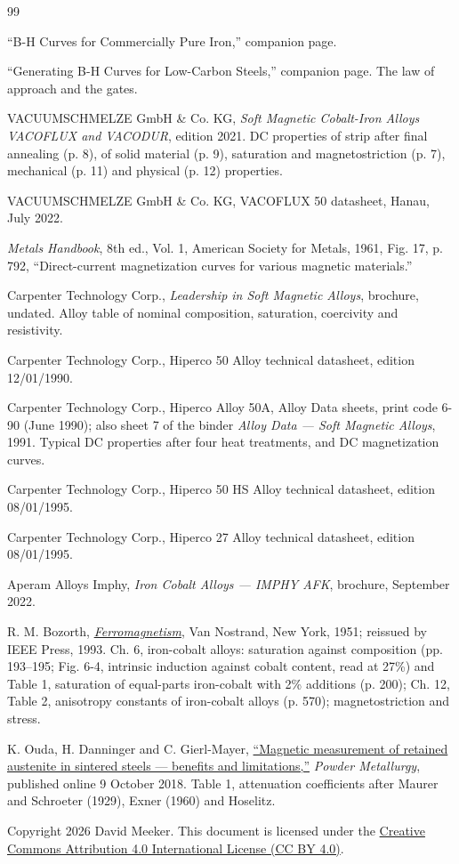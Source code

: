 \documentclass[
  11pt,
]{article}
\begin{document}
\begin{thebibliography}{99}\label{references}

 ``B-H Curves for Commercially Pure Iron,'' companion page.

 ``Generating B-H Curves for Low-Carbon Steels,'' companion page. The law of approach and the gates.

 VACUUMSCHMELZE GmbH \& Co. KG, \emph{Soft Magnetic Cobalt-Iron Alloys VACOFLUX and VACODUR}, edition 2021. DC properties of strip after final annealing (p. 8), of solid material (p. 9), saturation and magnetostriction (p. 7), mechanical (p. 11) and physical (p. 12) properties.

 VACUUMSCHMELZE GmbH \& Co. KG, VACOFLUX 50 datasheet, Hanau, July 2022.

 \emph{Metals Handbook}, 8th ed., Vol. 1, American Society for Metals, 1961, Fig. 17, p. 792, ``Direct-current magnetization curves for various magnetic materials.''

 Carpenter Technology Corp., \emph{Leadership in Soft Magnetic Alloys}, brochure, undated. Alloy table of nominal composition, saturation, coercivity and resistivity.

 Carpenter Technology Corp., Hiperco 50 Alloy technical datasheet, edition 12/01/1990.

 Carpenter Technology Corp., Hiperco Alloy 50A, Alloy Data sheets, print code 6-90 (June 1990); also sheet 7 of the binder \emph{Alloy Data --- Soft Magnetic Alloys}, 1991. Typical DC properties after four heat treatments, and DC magnetization curves.

 Carpenter Technology Corp., Hiperco 50 HS Alloy technical datasheet, edition 08/01/1995.

 Carpenter Technology Corp., Hiperco 27 Alloy technical datasheet, edition 08/01/1995.

 Aperam Alloys Imphy, \emph{Iron Cobalt Alloys --- IMPHY AFK}, brochure, September 2022.

 R. M. Bozorth, \href{https://doi.org/10.1109/9780470544624}{\emph{Ferromagnetism}}, Van Nostrand, New York, 1951; reissued by IEEE Press, 1993. Ch. 6, iron-cobalt alloys: saturation against composition (pp. 193--195; Fig. 6-4, intrinsic induction against cobalt content, read at 27\%) and Table 1, saturation of equal-parts iron-cobalt with 2\% additions (p. 200); Ch. 12, Table 2, anisotropy constants of iron-cobalt alloys (p. 570); magnetostriction and stress.

 K. Ouda, H. Danninger and C. Gierl-Mayer, \href{https://doi.org/10.1080/00325899.2018.1530850}{``Magnetic measurement of retained austenite in sintered steels --- benefits and limitations,''} \emph{Powder Metallurgy}, published online 9 October 2018. Table 1, attenuation coefficients after Maurer and Schroeter (1929), Exner (1960) and Hoselitz.

\end{thebibliography}

\noindent Copyright 2026 David Meeker. This document is licensed under the \href{https://creativecommons.org/licenses/by/4.0/}{Creative Commons Attribution 4.0 International License (CC BY 4.0)}.
\end{document}

